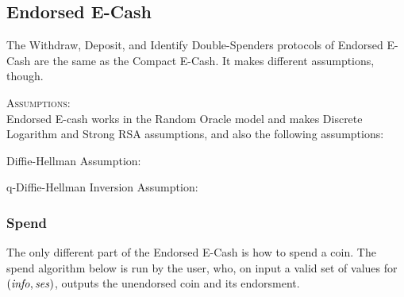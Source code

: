 \subsection{Endorsed E-Cash}
The Withdraw, Deposit, and Identify Double-Spenders protocols of Endorsed E-Cash \cite{clmENDORSED} are the same as the Compact E-Cash. It makes different assumptions, though.

\textsc{Assumptions}:\\
Endorsed E-cash works in the Random Oracle model and makes Discrete Logarithm and Strong RSA assumptions, and also the following assumptions:

Diffie-Hellman Assumption:

q-Diffie-Hellman Inversion Assumption:


\subsubsection{Spend}
The only different part of the Endorsed E-Cash is how to spend a coin. 
The spend algorithm below is run by the user, who, on input a valid
set of values for $(\mathit{info},\mathit{ses})$, outputs the unendorsed coin and its
endorsment.

